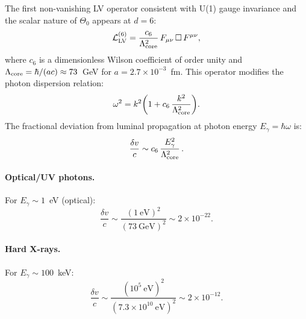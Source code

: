 ﻿\documentclass[a4paper,12pt]{article}
\begin{document}
The first non-vanishing LV operator consistent with U(1) gauge
invariance and the scalar nature of $\Theta_0$ appears at $d=6$:
\begin{equation}
  \mathcal{L}^{(6)}_{\rm LV} =
    \frac{c_6}{\Lambda_{\rm core}^2}\,
    F_{\mu\nu}\,\Box\,F^{\mu\nu},
  \label{eq:d6_LV}
\end{equation}
where $c_6$ is a dimensionless Wilson coefficient of order unity and
$\Lambda_{\rm core} = \hbar/(ac) \approx 73$~GeV for $a=2.7\times 10^{-3}$~fm.
This operator modifies the photon dispersion relation:
\begin{equation}
  \omega^2 = k^2\bigg(1 + c_6\,\frac{k^2}{\Lambda_{\rm core}^2}\bigg).
  \label{eq:dispersion}
\end{equation}
The fractional deviation from luminal propagation at photon energy
$E_\gamma = \hbar\omega$ is:
\begin{equation}
  \frac{\delta v}{c} \sim c_6\,
    \frac{E_\gamma^2}{\Lambda_{\rm core}^2}\,.
  \label{eq:dv}
\end{equation}

\paragraph{Optical/UV photons.}
For $E_\gamma \sim 1$~eV (optical):
\begin{equation}
  \frac{\delta v}{c} \sim
    \frac{(1~\text{eV})^2}{(73~\text{GeV})^2}
    \sim 2\times 10^{-22}.
\end{equation}

\paragraph{Hard X-rays.}
For $E_\gamma \sim 100$~keV:
\begin{equation}
  \frac{\delta v}{c} \sim
    \frac{(10^5~\text{eV})^2}{(7.3\times 10^{10}~\text{eV})^2}
    \sim 2\times 10^{-12}.
\end{equation}
\end{document}
